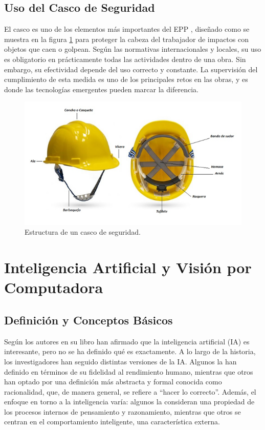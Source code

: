 \subsection{Uso del Casco de Seguridad}

El casco es uno de los elementos más importantes del EPP \cite{martinez2017aplicacion}, diseñado como se muestra en la figura \ref{fig:casco} para proteger la cabeza del trabajador de impactos con objetos que caen o golpean. Según las normativas internacionales y locales, su uso es obligatorio en prácticamente todas las actividades dentro de una obra. Sin embargo, su efectividad depende del uso correcto y constante. La supervisión del cumplimiento de esta medida es uno de los principales retos en las obras, y es donde las tecnologías emergentes pueden marcar la diferencia.

\begin{figure}[!ht]
  \centering
  \includegraphics[width=.49\linewidth]{images/casco.png}
  \caption{Estructura de un casco de seguridad.}
  \label{fig:casco}
\end{figure}

\section{Inteligencia Artificial y Visión por Computadora}

\subsection{Definición y Conceptos Básicos}

Según los autores en su libro \cite{russell2016artificial}  han afirmado que la inteligencia artificial (IA) es interesante, pero no se ha definido qué es exactamente. A lo largo de la historia, los investigadores han seguido distintas versiones de la IA. Algunos la han definido en términos de su fidelidad al rendimiento humano, mientras que otros han optado por una definición más abstracta y formal conocida como racionalidad, que, de manera general, se refiere a ``hacer lo correcto''. Además, el enfoque en torno a la inteligencia varía: algunos la consideran una propiedad de los procesos internos de pensamiento y razonamiento, mientras que otros se centran en el comportamiento inteligente, una característica externa.

